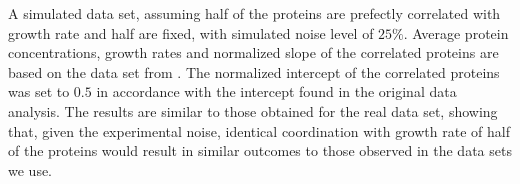 \label{fig:simulated}
A simulated data set, assuming half of the proteins are prefectly correlated with growth rate and half are fixed, with simulated noise level of $25\%$.
Average protein concentrations, growth rates and normalized slope of the correlated proteins are based on the data set from \cite{Heinemann2015}.
The normalized intercept of the correlated proteins was set to $0.5$ in accordance with the intercept found in the original data analysis.
The results are similar to those obtained for the real data set, showing that, given the experimental noise, identical coordination with growth rate of half of the proteins would result in similar outcomes to those observed in the data sets we use.